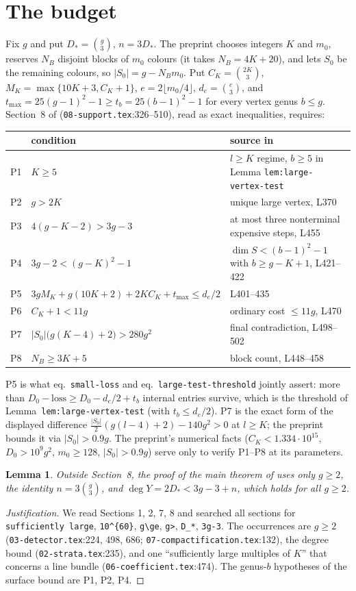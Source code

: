 \documentclass[11pt]{amsart}
\newtheorem{lemma}[theorem]{Lemma}
\theoremstyle{remark}
\begin{document}
\section{The budget}
Fix $g$ and put $D_*=\binom g3$, $n=3D_*$. The preprint chooses integers $K$ and $m_0$, reserves
$N_B$ disjoint blocks of $m_0$ colours (it takes $N_B=4K+20$), and lets $S_0$ be the remaining colours,
so $|S_0|=g-N_Bm_0$. Put $C_K=\binom{2K}3$, $M_K=\max\{10K+3,C_K+1\}$, $e=2\lfloor m_0/4\rfloor$,
$d_e=\binom e3$, and $t_{\max}=25(g-1)^2-1\ge t_b=25(b-1)^2-1$ for every vertex genus $b\le g$.
Section~8 of \cite{OAI053} (\texttt{08-support.tex}:326--510), read as exact inequalities, requires:
\begin{center}\small
\begin{tabular}{@{}lll@{}}
\toprule
& condition & source in \cite{OAI053}\\\midrule
P1 & $K\ge5$ & $l\ge K$ regime, $b\ge5$ in Lemma \texttt{lem:large-vertex-test}\\
P2 & $g>2K$ & unique large vertex, L370\\
P3 & $4(g-K-2)>3g-3$ & at most three nonterminal expensive steps, L455\\
P4 & $3g-2<(g-K)^2-1$ & $\dim S<(b-1)^2-1$ with $b\ge g-K+1$, L421--422\\
P5 & $3gM_K+g(10K+2)+2KC_K+t_{\max}\le d_e/2$ & L401--435\\
P6 & $C_K+1<11g$ & ordinary cost $\le11g$, L470\\
P7 & $|S_0|\bigl(g(K-4)+2\bigr)>280g^2$ & final contradiction, L498--502\\
P8 & $N_B\ge3K+5$ & block count, L448--458\\\bottomrule
\end{tabular}
\end{center}
P5 is what eq.~\texttt{small-loss} and eq.~\texttt{large-test-threshold} jointly assert: more than
$D_0-\text{loss}\ge D_0-d_e/2+t_b$ internal entries survive, which is the threshold of
Lemma~\texttt{lem:large-vertex-test} (with $t_b\le d_e/2$). P7 is the exact form of the displayed
difference $\frac{|S_0|}2(g(l-4)+2)-140g^2>0$ at $l\ge K$; the preprint bounds it via $|S_0|>0.9g$.
The preprint's numerical facts ($C_K<1.334\cdot10^{15}$, $D_0>10^9g^2$, $m_0\ge128$, $|S_0|>0.9g$)
serve only to verify P1--P8 at its parameters.

\begin{lemma}\label{lem:only}
Outside Section~8, the proof of the main theorem of \cite{OAI053} uses only $g\ge2$, the identity
$n=3\binom g3$, and $\deg Y=2D_*<3g-3+n$, which holds for all $g\ge2$.
\end{lemma}
\begin{proof}[Justification]\sloppy
We read Sections 1, 2, 7, 8 and searched all sections for \texttt{sufficiently large}, \texttt{10\^{}\{60\}},
\texttt{g\textbackslash ge}, \texttt{g>}, \texttt{D\_*}, \texttt{3g-3}. The occurrences are $g\ge2$
(\texttt{03-detector.tex}:224, 498, 686; \texttt{07-compactification.tex}:132), the degree bound
(\texttt{02-strata.tex}:235), and one ``sufficiently large multiples of $K$'' that concerns a line bundle
(\texttt{06-coefficient.tex}:474). The genus-$b$ hypotheses of the surface bound are P1, P2, P4.
\end{proof}
\end{document}
